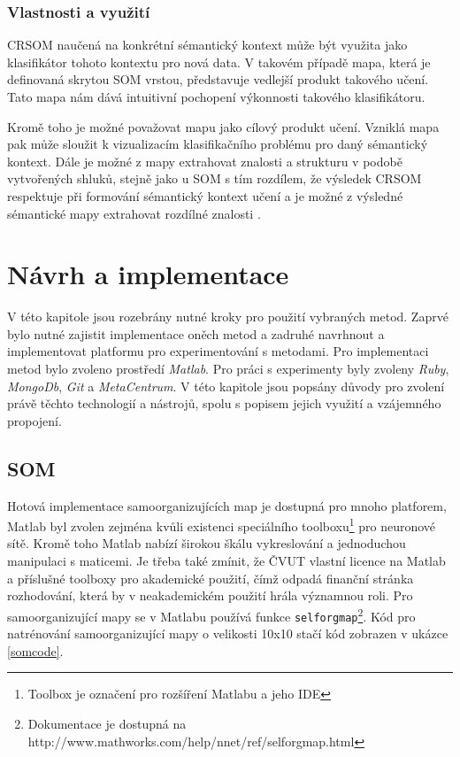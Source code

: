 \documentclass[thesis=M,czech]{FITthesis}[2012/06/26]
\begin{document}
\subsection{Vlastnosti a využití}

	CRSOM naučená na konkrétní sémantický kontext může být využita jako klasifikátor tohoto kontextu pro nová data. V takovém případě mapa, která je definovaná skrytou SOM vrstou, představuje vedlejší produkt takového učení. Tato mapa nám dává intuitivní pochopení výkonnosti takového klasifikátoru.

Kromě toho je možné považovat mapu jako cílový produkt učení. Vzniklá mapa pak může sloužit k vizualizacím klasifikačního problému pro daný sémantický kontext. Dále je možné z mapy extrahovat znalosti a strukturu v podobě vytvořených shluků, stejně jako u SOM s tím rozdílem, že výsledek CRSOM respektuje při formování sémantický kontext učení a je možné z výsledné sémantické mapy extrahovat rozdílné znalosti \cite{lms}.

\chapter{Návrh a implementace}
V této kapitole jsou rozebrány nutné kroky pro použití vybraných metod. Zaprvé bylo nutné zajistit implementace oněch metod a zadruhé navrhnout a implementovat platformu pro experimentování s metodami. Pro implementaci metod bylo zvoleno prostředí \textit{Matlab}. Pro práci s experimenty byly zvoleny \textit{Ruby}, \textit{MongoDb}, \textit{Git} a \textit{MetaCentrum}. V této kapitole jsou popsány důvody pro zvolení právě těchto technologií a nástrojů, spolu s popisem jejich využití a vzájemného propojení. 


\section{SOM}\label{sec:som_impl}
Hotová implementace samoorganizujících map je dostupná pro mnoho platforem, Matlab byl zvolen zejména kvůli existenci speciálního toolboxu\footnote{Toolbox je označení pro rozšíření Matlabu a jeho IDE} pro neuronové sítě. Kromě toho Matlab nabízí širokou škálu vykreslování a jednoduchou manipulaci s maticemi. Je třeba také zmínit, že ČVUT vlastní licence na Matlab a příslušné toolboxy pro akademické použití, čímž odpadá finanční stránka rozhodování, která by v neakademickém použití hrála významnou roli.
Pro samoorganizující mapy se v Matlabu používá funkce \texttt{selforgmap}\footnote{Dokumentace je dostupná na http://www.mathworks.com/help/nnet/ref/selforgmap.html}. Kód pro natrénování samoorganizující mapy o velikosti 10x10 stačí kód zobrazen v ukázce \ref{somcode}.
\end{document}
